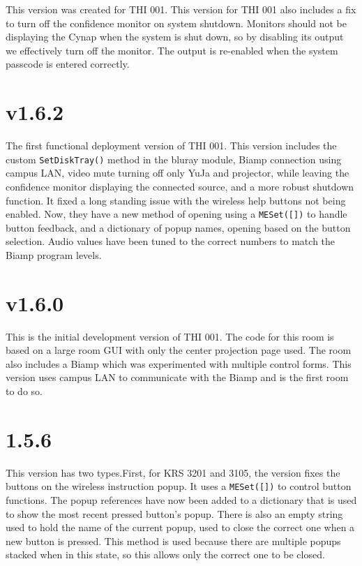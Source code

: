 \documentclass{article}
\begin{document}
This version was created for THI 001. This version for THI 001 also includes a fix to turn off the confidence monitor 
on system shutdown. Monitors should not be displaying the Cynap when the system is shut down, so by disabling its output we 
effectively turn off the monitor. The output is re-enabled when the system passcode is entered correctly. 

\section*{v1.6.2}

The first functional deployment version of THI 001. This version includes the custom \lstinline|SetDiskTray()| method in 
the bluray module, Biamp connection using campus LAN, video mute turning off only YuJa and projector, while leaving the 
confidence monitor displaying the connected source, and a more robust shutdown function. It fixed a long standing issue 
with the wireless help buttons not being enabled. Now, they have a new method of opening using a \lstinline|MESet([])| 
to handle button feedback, and a dictionary of popup names, opening based on the button selection. Audio values have been 
tuned to the correct numbers to match the Biamp program levels. 

\section*{v1.6.0}

This is the initial development version of THI 001. The code for this room is based on a large room GUI with only the center 
projection page used. The room also includes a Biamp which was experimented with multiple control forms. This version uses
campus LAN to communicate with the Biamp and is the first room to do so.

\section*{1.5.6}

This version has two types.First, for KRS 3201 and 3105, the version fixes the buttons on the wireless instruction popup. It uses a
\lstinline|MESet([])| to control button functions. The popup references have now been added to a dictionary that is used to 
show the most recent pressed button's popup. There is also an empty string used to hold the name of the current popup, used
to close the correct one when a new button is pressed. This method is used because there are multiple popups stacked when in 
this state, so this allows only the correct one to be closed. 
\end{document}
